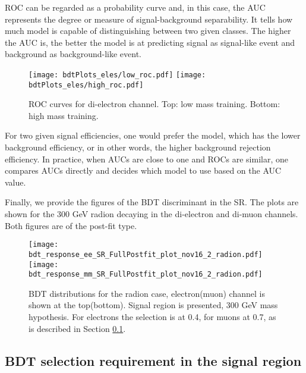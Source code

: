 ROC can be regarded as a probability curve and, in this case, the AUC represents the degree or measure of signal-background separability. It tells how much model is capable of distinguishing between two given classes. The higher the AUC is, the better the model is at predicting signal as signal-like event and background as background-like event.

\begin{figure}[H]
  \begin{center}
   \texttt{[image: bdtPlots\_eles/low\_roc.pdf]}
   \texttt{[image: bdtPlots\_eles/high\_roc.pdf]}
    \caption{ ROC curves for di-electron channel. Top: low mass training. Bottom: high mass training. }
    \label{fig:ele_ROCs}
  \end{center}
\end{figure}

For two given signal efficiencies, one would prefer the model, which has the lower background efficiency, or in other words, the higher background rejection efficiency. In practice, when AUCs are close to one and ROCs are similar, one compares AUCs directly and decides which model to use based on the AUC value. 

Finally, we provide the figures of the BDT discriminant in the SR. The plots are shown for the 300 GeV radion decaying in the di-electron and di-muon channels. Both figures are of the post-fit type.

\begin{figure}[H]
  \begin{center}
   \texttt{[image: bdt\_response\_ee\_SR\_FullPostfit\_plot\_nov16\_2\_radion.pdf]}\\
   \texttt{[image: bdt\_response\_mm\_SR\_FullPostfit\_plot\_nov16\_2\_radion.pdf]}\\
    \caption{ BDT distributions for the radion case, electron(muon) channel is shown at the top(bottom). Signal region is presented, 300 GeV mass hypothesis. For electrons the selection is at 0.4, for muons at 0.7, as is described in Section \ref{BDT_selection_in_SR}.}
    \label{fig:BDTs}
  \end{center}
\end{figure}

\subsection{BDT selection requirement in the signal region}
\label{BDT_selection_in_SR}

